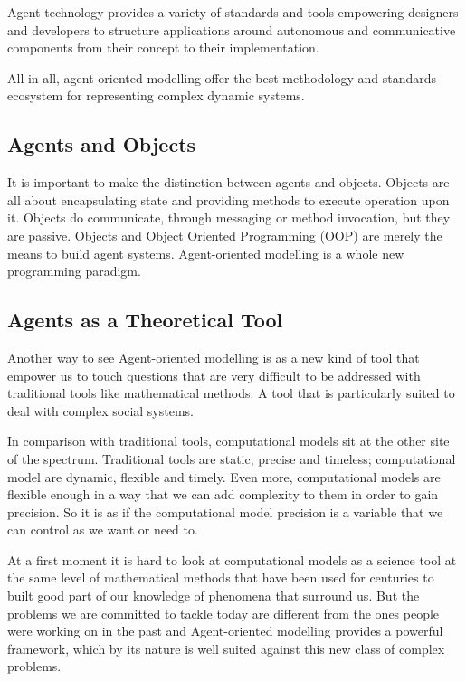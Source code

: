 Agent technology provides a variety of standards and tools empowering designers and developers to structure applications around autonomous and communicative components from their concept to their implementation.\cite{al3roadmap}

All in all, agent-oriented modelling offer the best methodology and standards ecosystem for representing complex dynamic systems.

\subsection{Agents and Objects}

It is important to make the distinction between agents and objects. Objects are all about encapsulating state and providing methods to execute operation upon it. Objects do communicate, through messaging or method invocation, but they are passive. Objects and Object Oriented Programming (OOP) are merely the means to build agent systems. Agent-oriented modelling is a whole new programming paradigm. 

\subsection{Agents as a Theoretical Tool}

Another way to see Agent-oriented modelling is as a new kind of tool that empower us to touch questions that are very difficult to be addressed with traditional tools like mathematical methods. A tool that is particularly suited to deal with complex social systems.

In comparison with traditional tools, computational models sit at the other site of the spectrum. Traditional tools are static, precise and timeless; computational model are dynamic, flexible and timely. Even more, computational models are flexible enough in a way that we can add complexity to them in order to gain precision. So it is as if the computational model precision is a variable that we can control as we want or need to.

At a first moment it is hard to look at computational models as a science tool at the same level of mathematical methods that have been used for centuries to built good part of our knowledge of phenomena that surround us. But the problems we are committed to tackle today are different from the ones people were working on in the past and Agent-oriented modelling provides a powerful framework, which by its nature is well suited against this new class of complex problems.


